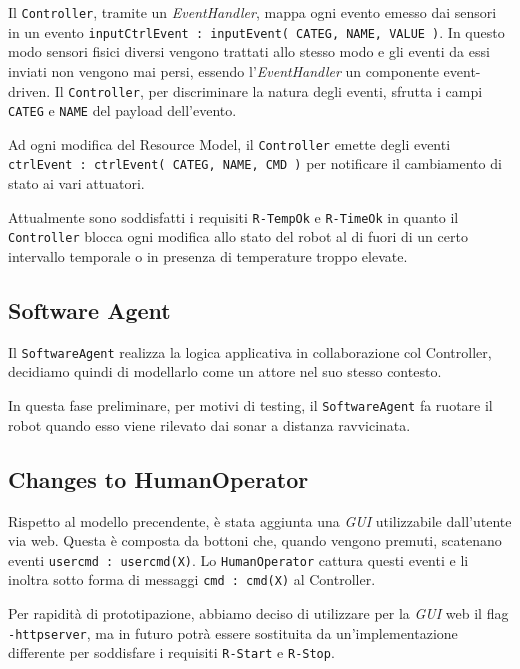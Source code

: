 \documentclass{../llncs}
\newcommand{\codescript}[1]{{\mbox{\small{\texttt{#1}}}}\xspace}
\newcommand{\code}[1]{{\color{blue}\small{\texttt{#1}}}}
\begin{document}
Il \texttt{Controller}, tramite un \emph{EventHandler}, mappa ogni evento emesso dai sensori in un evento \codescript{inputCtrlEvent  : inputEvent( CATEG, NAME, VALUE )}. In questo modo sensori fisici diversi vengono trattati allo stesso modo e gli eventi da essi inviati non vengono mai persi, essendo l'\emph{EventHandler} un componente event-driven. Il \texttt{Controller}, per discriminare la natura degli eventi, sfrutta i campi \codescript{CATEG} e \codescript{NAME} del payload dell'evento.

Ad ogni modifica del Resource Model, il \texttt{Controller} emette degli eventi \codescript{ctrlEvent : ctrlEvent( CATEG, NAME, CMD )} per notificare il cambiamento di stato ai vari attuatori.

Attualmente sono soddisfatti i requisiti \code{R-TempOk} e \code{R-TimeOk} in quanto il \texttt{Controller} blocca ogni modifica allo stato del robot al di fuori di un certo intervallo temporale o in presenza di temperature troppo elevate.

\subsection{Software Agent}
Il \texttt{SoftwareAgent} realizza la logica applicativa in collaborazione col Controller,  decidiamo quindi di modellarlo come un attore nel suo stesso contesto.

In questa fase preliminare, per motivi di testing, il \texttt{SoftwareAgent} fa ruotare il robot quando esso viene rilevato dai sonar a distanza ravvicinata.

 

\subsection{Changes to HumanOperator}
Rispetto al modello precendente, è stata aggiunta una \emph{GUI} utilizzabile dall'utente via web. Questa è composta da bottoni che, quando vengono premuti, scatenano eventi \codescript{usercmd : usercmd(X)}. Lo \texttt{HumanOperator} cattura questi eventi e li inoltra sotto forma di messaggi \codescript{cmd : cmd(X)} al Controller.

Per rapidità di prototipazione, abbiamo deciso di  utilizzare per la \emph{GUI} web il flag \codescript{-httpserver}, ma in futuro potrà essere sostituita da un'implementazione differente per soddisfare i requisiti \code{R-Start} e \code{R-Stop}.
\end{document}
